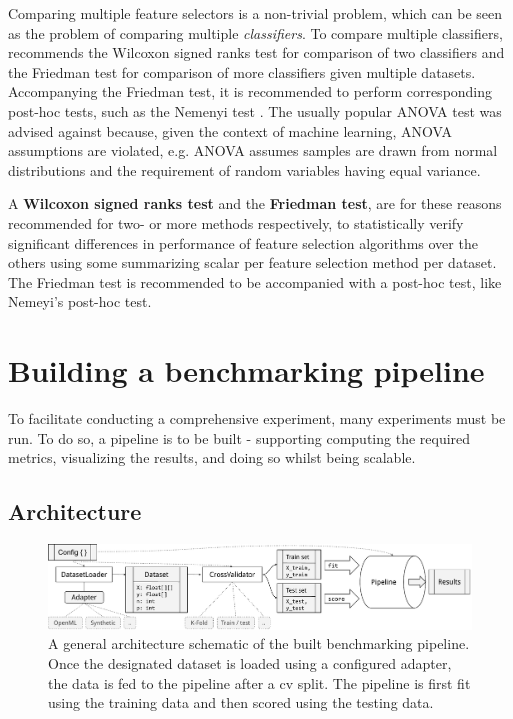 \documentclass{article}
\begin{document}
Comparing multiple feature selectors is a non-trivial problem, which can be seen as the problem of comparing multiple \textit{classifiers}. To compare multiple classifiers, \citep{demsar_statistical_2006} recommends the Wilcoxon signed ranks test for comparison of two classifiers and the Friedman test for comparison of more classifiers given multiple datasets. Accompanying the Friedman test, it is recommended to perform corresponding post-hoc tests, such as the Nemenyi test \citep{nemenyi_distribution-free_1963}. The usually popular ANOVA test was advised against because, given the context of machine learning, ANOVA assumptions are violated, e.g. ANOVA assumes samples are drawn from normal distributions and the requirement of random variables having equal variance.

A \textbf{Wilcoxon signed ranks test} and the \textbf{Friedman test}, are for these reasons recommended for two- or more methods respectively, to statistically verify significant differences in performance of feature selection algorithms over the others using some summarizing scalar per feature selection method per dataset. The Friedman test is recommended to be accompanied with a post-hoc test, like Nemeyi's post-hoc test.

\section{Building a benchmarking pipeline}\label{section:pipeline}
To facilitate conducting a comprehensive experiment, many experiments must be run. To do so, a pipeline is to be built - supporting computing the required metrics, visualizing the results, and doing so whilst being scalable. 

\subsection{Architecture}


\begin{figure}[h]
    \centering
    \includegraphics[width=\linewidth]{report/images/schematic-main-architecture.pdf}
    \caption{A general architecture schematic of the built benchmarking pipeline. Once the designated dataset is loaded using a configured adapter, the data is fed to the pipeline after a \gls{cv} split. The pipeline is first fit using the training data and then scored using the testing data.}
    \label{fig:schematic-main-architecture}
\end{figure}
\end{document}
